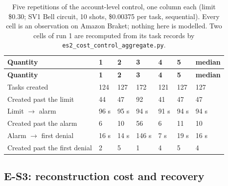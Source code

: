 \documentclass[acmsmall,screen,review]{acmart}
\begin{document}
\begingroup
\small
\setlength\LTleft{\fill}
\setlength\LTright{\fill}
\begin{xltabular}{\textwidth}{Yllllll}
\caption{Five repetitions of the account-level control, one column each (limit \$0.30; SV1 Bell circuit, 10 shots, \$0.00375 per task, sequential). Every cell is an observation on Amazon Braket; nothing here is modelled. Two cells of run 1 are recomputed from its task records by \texttt{es2\_\allowbreak{}cost\_\allowbreak{}control\_\allowbreak{}aggregate.\allowbreak{}py}.}\label{tab:9} \\
\toprule
\textbf{Quantity} & \textbf{1} & \textbf{2} & \textbf{3} & \textbf{4} & \textbf{5} & \textbf{median} \\
\midrule
\endfirsthead
\toprule
\textbf{Quantity} & \textbf{1} & \textbf{2} & \textbf{3} & \textbf{4} & \textbf{5} & \textbf{median} \\
\midrule
\endhead
\endfoot
\bottomrule
\endlastfoot
Tasks created & 124 & 127 & 172 & 121 & 127 & 127 \\*
Created past the limit & 44 & 47 & 92 & 41 & 47 & 47 \\*
Limit $\rightarrow$ alarm & 96 s & 95 s & 94 s & 91 s & 94 s & 94 s \\*
Created past the alarm & 6 & 10 & 56 & 6 & 11 & 10 \\*
Alarm $\rightarrow$ first denial & 16 s & 14 s & 146 s & 7 s & 19 s & 16 s \\*
Created past the first denial & 2 & 5 & 1 & 4 & 5 & 4 \\
\end{xltabular}
\endgroup


\subsection{E-S3: reconstruction cost and recovery}
\end{document}
